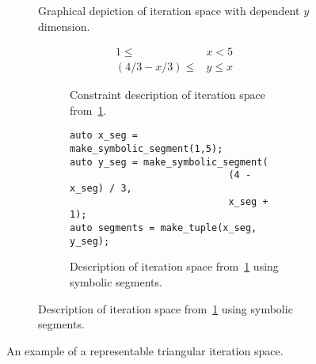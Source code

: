\begin{figure}


\begin{subfigure}{0.41\columnwidth}
\caption{Graphical depiction of iteration space with dependent $y$ dimension.}\label{triangularIterationSpace2}
\end{subfigure}
\hspace{0.05\columnwidth}
\begin{subfigure}{0.50\columnwidth}
\begin{subfigure}{\columnwidth}
\begin{align}
	1 \leq &x < 5 \\
	(4/3 - x/3) \leq &y \leq x
\end{align}
\caption{Constraint description of iteration space from~\ref{triangularIterationSpace2}.}\label{constraintDescription2}
\end{subfigure}

\vspace{20pt}

\begin{subfigure}{\columnwidth}
\begin{lstlisting}[]
auto x_seg = make_symbolic_segment(1,5);
auto y_seg = make_symbolic_segment(
							(4 - x_seg) / 3, 
							x_seg + 1);
auto segments = make_tuple(x_seg, y_seg);
\end{lstlisting}
\caption{Description of iteration space from~\ref{triangularIterationSpace2} using symbolic segments.}\label{symseg2}
\end{subfigure}
\end{subfigure}
\caption{An example of a representable triangular iteration space.}\label{goodTriangles}
\end{figure}



